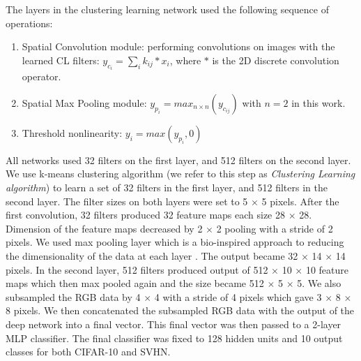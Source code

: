 \documentclass{article} %
\begin{document}
The layers in the clustering learning network used the following sequence of operations:
\begin{enumerate}
\item Spatial Convolution module: performing convolutions on images with the learned CL filters: $y_{c_i}=\sum_i{k_{ij}\ast x_i}$,
where $\ast$ is the 2D discrete convolution operator.
\item Spatial Max Pooling module: $y_{p_i} = max_{n \times n}(y_{c_{ij}})$ with $n =  2$ in this work.
\item Threshold nonlinearity: $y_i = max(y_{p_i}, 0)$
\end{enumerate}

All networks used 32 filters on the first layer, and 512 filters on the second layer.
We use k-means clustering algorithm (we refer to this step as \textit{Clustering Learning algorithm})
to learn a set of 32 filters in the first layer, and 512 filters in the second layer.
The filter sizes on both layers were set to 5 $\times$ 5 pixels.
After the first convolution, 32 filters produced 32 feature maps each size 28 $\times$ 28.
Dimension of the feature maps decreased by 2 $\times$ 2 pooling with a stride of 2 pixels.
We used max pooling layer which is a bio-inspired approach to reducing the dimensionality of the data at each layer \cite{lampl2004intracellular}.
The output became 32 $\times$ 14 $\times$ 14 pixels.
In the second layer, 512 filters produced output of 512 $\times$ 10 $\times$ 10 feature maps which then max pooled again and the size became 512 $\times$ 5 $\times$ 5. 
We also subsampled the RGB data by 4 $\times$ 4 with a stride of 4 pixels which gave 3 $\times$ 8 $\times$ 8 pixels.
We then concatenated the subsampled RGB data with the output of the deep network into a final vector.
This final vector was then passed to a 2-layer MLP classifier.
The final classifier was fixed to 128 hidden units and 10 output classes for both CIFAR-10 and SVHN.



\end{document}
